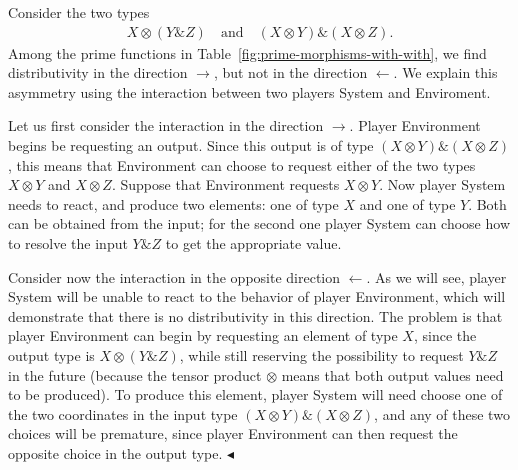 \documentclass[10pt,a4paper]{amsart}
\numberwithin{equation}{section}
\theoremstyle{plain}
\newcommand{\exampleend}{$\blacktriangleleft$}
\begin{document}
\begin{example}\label{ex:amp-otimes-distr}
    Consider the two types 
    \begin{align*}
        X \otimes (Y \& Z) 
        \quad \text{and} \quad
        (X \otimes Y) \& (X \otimes Z).
    \end{align*}
    Among the prime functions in Table~\ref{fig:prime-morphisms-with-with}, we find distributivity in the direction $\rightarrow$, but not in the direction $\leftarrow$. We explain this asymmetry using the interaction between two players System and Enviroment.

    Let us first consider the interaction in the  direction $\rightarrow$. Player Environment begins be requesting an output. Since this output is of type $(X \otimes Y) \& (X \otimes Z)$, this means that Environment can choose to request either of the two types  $X \otimes Y$ and $X \otimes Z$. Suppose that Environment requests $X \otimes Y$. Now player System needs to react, and produce two elements: one of type $X$ and one of type $Y$. Both can be obtained from the input; for the second one player System can choose how to resolve the input $Y \& Z$ to get the appropriate value. 

    Consider now the interaction in the opposite direction $\leftarrow$. As we will see, player System will be unable to react to the behavior of player Environment, which will demonstrate that there is no distributivity in this direction. The problem is that player Environment can begin by requesting an element of type $X$, since the output type is $X \otimes (Y \& Z)$, while still reserving the possibility to request $Y \& Z$ in the future (because the tensor product $\otimes$ means that both output values need to be produced). To produce this element, player System will need  choose one of the two coordinates in the input type $(X \otimes Y) \& (X \otimes Z)$, and any of these two  choices will be premature, since player Environment can then request the opposite choice in the output type.  \exampleend
\end{example}
\end{document}
